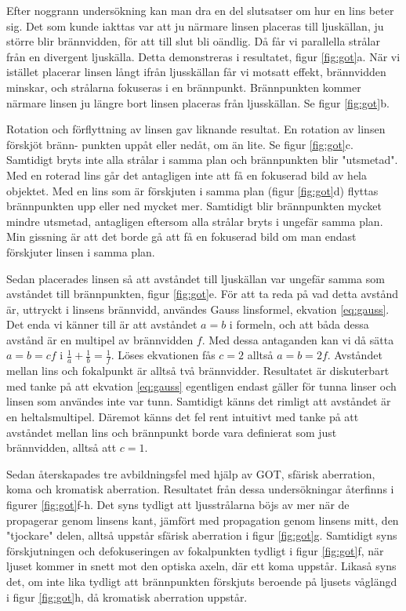 \documentclass[a4paper]{article}
\begin{document}
Efter noggrann undersökning kan man dra en del slutsatser om hur en lins beter sig. Det som kunde iakttas var att
ju närmare linsen placeras till ljuskällan, ju större blir brännvidden, för att till slut bli oändlig. Då får vi
parallella strålar från en divergent ljuskälla. Detta demonstreras i resultatet, figur \ref{fig:got}a. 
När vi istället placerar linsen långt ifrån ljusskällan får vi motsatt effekt, brännvidden minskar, och strålarna
fokuseras i en brännpunkt. Brännpunkten kommer närmare linsen ju längre bort linsen placeras från ljusskällan. Se figur \ref{fig:got}b.

Rotation och förflyttning av linsen gav liknande resultat. En rotation av linsen förskjöt bränn-
punkten uppåt eller nedåt, om än lite. Se figur \ref{fig:got}c. Samtidigt bryts inte alla strålar i samma plan och brännpunkten
blir "utsmetad". Med en roterad lins går det antagligen inte att få en fokuserad bild av hela objektet. Med en lins
som är förskjuten i samma plan (figur \ref{fig:got}d) flyttas brännpunkten upp eller ned mycket mer. Samtidigt blir
brännpunkten mycket mindre utsmetad, antagligen eftersom alla strålar bryts i ungefär samma plan. Min gissning är att
det borde gå att få en fokuserad bild om man endast förskjuter linsen i samma plan.

Sedan placerades linsen så att avståndet till ljuskällan var ungefär samma som avståndet till brännpunkten, figur \ref{fig:got}e.
För att ta reda på vad detta avstånd är, uttryckt i linsens brännvidd, användes Gauss linsformel, ekvation \ref{eq:gauss}. Det enda vi
känner till är att avståndet $a = b$ i formeln, och att båda dessa avstånd är en multipel av brännvidden $f$. Med dessa antaganden
kan vi då sätta $a = b = cf$ i $ \frac{1}{a} + \frac{1}{b} = \frac{1}{f}$. Löses ekvationen fås $c=2$ alltså $a=b=2f$. Avståndet mellan
lins och fokalpunkt är alltså två brännvidder. Resultatet är diskuterbart med tanke på att ekvation \ref{eq:gauss} egentligen endast gäller
för tunna linser och linsen som användes inte var tunn. Samtidigt känns det rimligt att avståndet är en heltalsmultipel. Däremot känns det
fel rent intuitivt med tanke på att avståndet mellan lins och brännpunkt borde vara definierat som just brännvidden, alltså att $c = 1$.

Sedan återskapades tre avbildningsfel med hjälp av GOT, sfärisk aberration, koma och kromatisk aberration. Resultatet från dessa undersökningar
återfinns i figurer \ref{fig:got}f-h. Det syns tydligt att ljusstrålarna böjs av mer när de propagerar genom linsens kant, jämfört med propagation
genom linsens mitt, den "tjockare" delen, alltså uppstår sfärisk aberration i figur \ref{fig:got}g. Samtidigt syns förskjutningen och defokuseringen
av fokalpunkten tydligt i figur \ref{fig:got}f, när ljuset kommer in snett mot den optiska axeln, där ett koma uppstår. Likaså syns det, om inte lika 
tydligt att brännpunkten förskjuts beroende på ljusets våglängd i figur \ref{fig:got}h, då kromatisk aberration uppstår.
\end{document}
